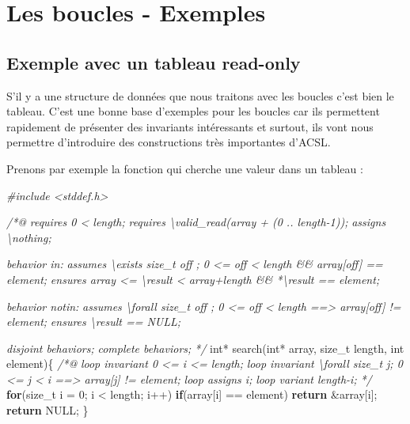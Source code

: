 \documentclass[12pt,francais,]{scrbook}
\newenvironment{Shaded}{}{}
\newcommand{\KeywordTok}[1]{\textcolor[rgb]{0.00,0.44,0.13}{\textbf{{#1}}}}
\newcommand{\DataTypeTok}[1]{\textcolor[rgb]{0.56,0.13,0.00}{{#1}}}
\newcommand{\DecValTok}[1]{\textcolor[rgb]{0.25,0.63,0.44}{{#1}}}
\newcommand{\CommentTok}[1]{\textcolor[rgb]{0.38,0.63,0.69}{\textit{{#1}}}}
\newcommand{\NormalTok}[1]{{#1}}
\begin{document}
\section{Les boucles - Exemples}\label{les-boucles---exemples}

\subsection{Exemple avec un tableau
read-only}\label{exemple-avec-un-tableau-read-only}

S'il y a une structure de données que nous traitons avec les boucles
c'est bien le tableau. C'est une bonne base d'exemples pour les boucles
car ils permettent rapidement de présenter des invariants intéressants
et surtout, ils vont nous permettre d'introduire des constructions très
importantes d'ACSL.

Prenons par exemple la fonction qui cherche une valeur dans un tableau :

\begin{footnotesize}\begin{Shaded}
\begin{Highlighting}[]
\CommentTok{#include <stddef.h>}

\CommentTok{/*@}
\CommentTok{  requires 0 < length;}
\CommentTok{  requires \textbackslash{}valid_read(array + (0 .. length-1));}
\CommentTok{  }
\CommentTok{  assigns  \textbackslash{}nothing;}

\CommentTok{  behavior in:}
\CommentTok{    assumes \textbackslash{}exists size_t off ; 0 <= off < length && array[off] == element;}
\CommentTok{    ensures array <= \textbackslash{}result < array+length && *\textbackslash{}result == element;}

\CommentTok{  behavior notin:}
\CommentTok{    assumes \textbackslash{}forall size_t off ; 0 <= off < length ==> array[off] != element;}
\CommentTok{    ensures \textbackslash{}result == NULL;}

\CommentTok{  disjoint behaviors;}
\CommentTok{  complete behaviors;}
\CommentTok{*/}
\DataTypeTok{int}\NormalTok{* search(}\DataTypeTok{int}\NormalTok{* array, size_t length, }\DataTypeTok{int} \NormalTok{element)\{}
  \CommentTok{/*@}
\CommentTok{    loop invariant 0 <= i <= length;}
\CommentTok{    loop invariant \textbackslash{}forall size_t j; 0 <= j < i ==> array[j] != element;}
\CommentTok{    loop assigns i;}
\CommentTok{    loop variant length-i;}
\CommentTok{  */} 
  \KeywordTok{for}\NormalTok{(size_t i = }\DecValTok{0}\NormalTok{; i < length; i++)}
    \KeywordTok{if}\NormalTok{(array[i] == element) }\KeywordTok{return} \NormalTok{&array[i];}
  \KeywordTok{return} \NormalTok{NULL;}
\NormalTok{\}}
\end{Highlighting}
\end{Shaded}\end{footnotesize}
\end{document}
